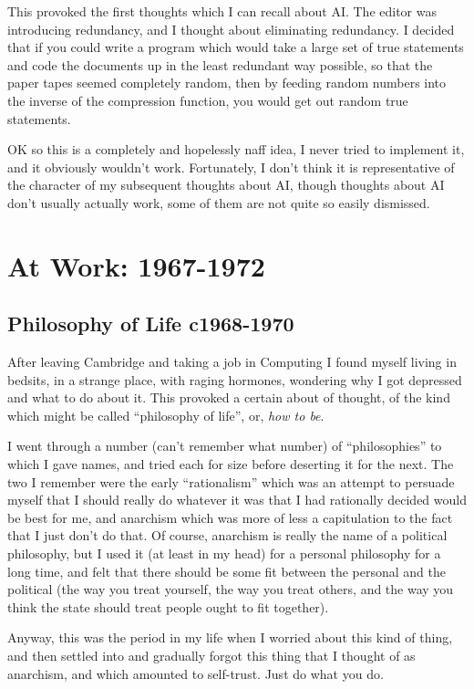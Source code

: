 \documentclass[10pt,titlepage]{book}
\begin{document}
This provoked the first thoughts which I can recall about AI.
The editor was introducing redundancy, and I thought about eliminating redundancy.
I decided that if you could write a program which would take a large set of true statements and code the documents up in the least redundant way possible, so that the paper tapes seemed completely random, then by feeding random numbers into the inverse of the compression function, you would get out random true statements.

OK so this is a completely and hopelessly naff idea, I never tried to implement it, and it obviously wouldn't work.
Fortunately, I don't think it is representative of the character of my subsequent thoughts about AI, though thoughts about AI don't usually actually work, some of them are not quite so easily dismissed.

\chapter{At Work: 1967-1972}

\section{Philosophy of Life c1968-1970}

After leaving Cambridge and taking a job in Computing I found myself living in bedsits, in a strange place, with raging hormones, wondering why I got depressed and what to do about it.
This provoked a certain about of thought, of the kind which might be called ``philosophy of life'', or, {\it how to be}.

I went through a number (can't remember what number) of ``philosophies'' to which I gave names, and tried each for size before deserting it for the next.
The two I remember were the early ``rationalism'' which was an attempt to persuade myself that I should really do whatever it was that I had rationally decided would be best for me, and anarchism which was more of less a capitulation to the fact that I just don't do that.
Of course, anarchism is really the name of a political philosophy, but I used it (at least in my head) for a personal philosophy for a long time, and felt that there should be some fit between the personal and the political (the way you treat yourself, the way you treat others, and the way you think the state should treat people ought to fit together).

Anyway, this was the period in my life when I worried about this kind of thing, and then settled into and gradually forgot this thing that I thought of as anarchism, and which amounted to self-trust.
Just do what you do.
\end{document}
